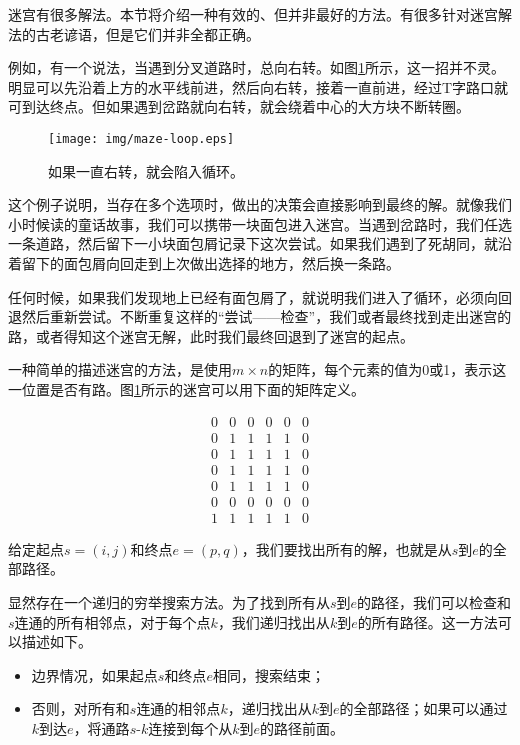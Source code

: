 \documentclass[UTF8]{article}
\begin{document}
迷宫有很多解法。本节将介绍一种有效的、但并非最好的方法。有很多针对迷宫解法的古老谚语，但是它们并非全都正确。

例如，有一个说法，当遇到分叉道路时，总向右转。如图\ref{fig:maze-loop}所示，这一招并不灵。明显可以先沿着上方的水平线前进，然后向右转，接着一直前进，经过T字路口就可到达终点。但如果遇到岔路就向右转，就会绕着中心的大方块不断转圈。

\begin{figure}[htbp]
 \centering
 \texttt{[image: img/maze-loop.eps]}
 \caption{如果一直右转，就会陷入循环。}
 \label{fig:maze-loop}
\end{figure}

这个例子说明，当存在多个选项时，做出的决策会直接影响到最终的解。就像我们小时候读的童话故事，我们可以携带一块面包进入迷宫。当遇到岔路时，我们任选一条道路，然后留下一小块面包屑记录下这次尝试。如果我们遇到了死胡同，就沿着留下的面包屑向回走到上次做出选择的地方，然后换一条路。

任何时候，如果我们发现地上已经有面包屑了，就说明我们进入了循环，必须向回退然后重新尝试。不断重复这样的“尝试——检查”，我们或者最终找到走出迷宫的路，或者得知这个迷宫无解，此时我们最终回退到了迷宫的起点。

一种简单的描述迷宫的方法，是使用$m \times n$的矩阵，每个元素的值为0或1，表示这一位置是否有路。图\ref{fig:maze-loop}所示的迷宫可以用下面的矩阵定义。

\[
\begin{matrix}
0 & 0 & 0 & 0 & 0 & 0 \\
0 & 1 & 1 & 1 & 1 & 0 \\
0 & 1 & 1 & 1 & 1 & 0 \\
0 & 1 & 1 & 1 & 1 & 0 \\
0 & 1 & 1 & 1 & 1 & 0 \\
0 & 0 & 0 & 0 & 0 & 0 \\
1 & 1 & 1 & 1 & 1 & 0
\end{matrix}
\]

给定起点$s=(i, j)$和终点$e=(p, q)$，我们要找出所有的解，也就是从$s$到$e$的全部路径。

显然存在一个递归的穷举搜索方法。为了找到所有从$s$到$e$的路径，我们可以检查和$s$连通的所有相邻点，对于每个点$k$，我们递归找出从$k$到$e$的所有路径。这一方法可以描述如下。

\begin{itemize}
\item 边界情况，如果起点$s$和终点$e$相同，搜索结束；
\item 否则，对所有和$s$连通的相邻点$k$，递归找出从$k$到$e$的全部路径；如果可以通过$k$到达$e$，将通路$s$-$k$连接到每个从$k$到$e$的路径前面。
\end{itemize}
\end{document}
